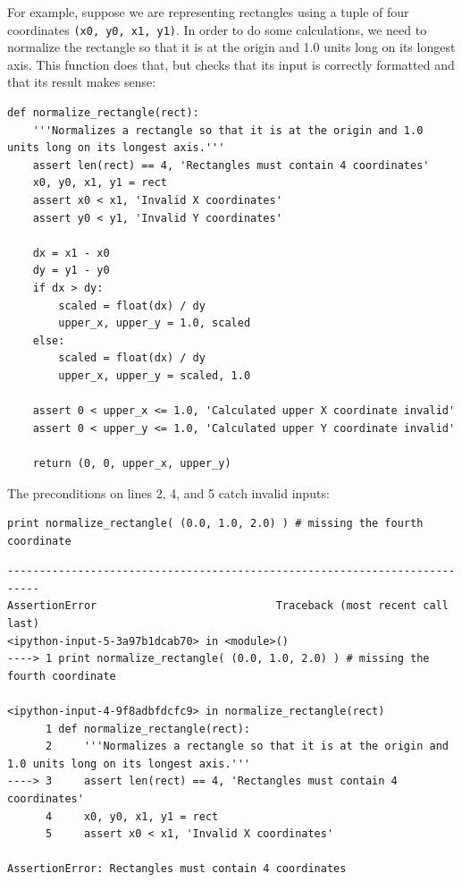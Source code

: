\documentclass{book}
\begin{document}
For example, suppose we are representing rectangles using a tuple of
four coordinates \texttt{(x0, y0, x1, y1)}. In order to do some
calculations, we need to normalize the rectangle so that it is at the
origin and 1.0 units long on its longest axis. This function does that,
but checks that its input is correctly formatted and that its result
makes sense:

\begin{verbatim}
def normalize_rectangle(rect):
    '''Normalizes a rectangle so that it is at the origin and 1.0 units long on its longest axis.'''
    assert len(rect) == 4, 'Rectangles must contain 4 coordinates'
    x0, y0, x1, y1 = rect
    assert x0 < x1, 'Invalid X coordinates'
    assert y0 < y1, 'Invalid Y coordinates'

    dx = x1 - x0
    dy = y1 - y0
    if dx > dy:
        scaled = float(dx) / dy
        upper_x, upper_y = 1.0, scaled
    else:
        scaled = float(dx) / dy
        upper_x, upper_y = scaled, 1.0

    assert 0 < upper_x <= 1.0, 'Calculated upper X coordinate invalid'
    assert 0 < upper_y <= 1.0, 'Calculated upper Y coordinate invalid'

    return (0, 0, upper_x, upper_y)
\end{verbatim}

The preconditions on lines 2, 4, and 5 catch invalid inputs:

\begin{verbatim}
print normalize_rectangle( (0.0, 1.0, 2.0) ) # missing the fourth coordinate
\end{verbatim}

\begin{verbatim}
---------------------------------------------------------------------------
AssertionError                            Traceback (most recent call last)
<ipython-input-5-3a97b1dcab70> in <module>()
----> 1 print normalize_rectangle( (0.0, 1.0, 2.0) ) # missing the fourth coordinate

<ipython-input-4-9f8adbfdcfc9> in normalize_rectangle(rect)
      1 def normalize_rectangle(rect):
      2     '''Normalizes a rectangle so that it is at the origin and 1.0 units long on its longest axis.'''
----> 3     assert len(rect) == 4, 'Rectangles must contain 4 coordinates'
      4     x0, y0, x1, y1 = rect
      5     assert x0 < x1, 'Invalid X coordinates'

AssertionError: Rectangles must contain 4 coordinates
\end{verbatim}
\end{document}
